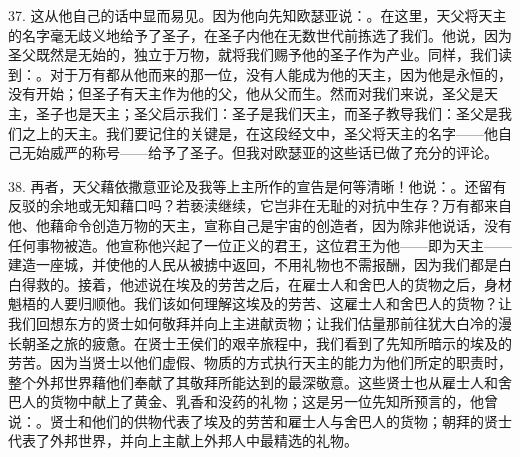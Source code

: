 37. 这从他自己的话中显而易见。因为他向先知欧瑟亚说：。在这里，天父将天主的名字毫无歧义地给予了圣子，在圣子内他在无数世代前拣选了我们。他说，因为圣父既然是无始的，独立于万物，就将我们赐予他的圣子作为产业。同样，我们读到：。对于万有都从他而来的那一位，没有人能成为他的天主，因为他是永恒的，没有开始；但圣子有天主作为他的父，他从父而生。然而对我们来说，圣父是天主，圣子也是天主；圣父启示我们：圣子是我们天主，而圣子教导我们：圣父是我们之上的天主。我们要记住的关键是，在这段经文中，圣父将天主的名字——他自己无始威严的称号——给予了圣子。但我对欧瑟亚的这些话已做了充分的评论。\par

38. 再者，天父藉依撒意亚论及我等上主所作的宣告是何等清晰！他说：。还留有反驳的余地或无知藉口吗？若亵渎继续，它岂非在无耻的对抗中生存？万有都来自他、他藉命令创造万物的天主，宣称自己是宇宙的创造者，因为除非他说话，没有任何事物被造。他宣称他兴起了一位正义的君王，这位君王为他——即为天主——建造一座城，并使他的人民从被掳中返回，不用礼物也不需报酬，因为我们都是白白得救的。接着，他述说在埃及的劳苦之后，在雇士人和舍巴人的货物之后，身材魁梧的人要归顺他。我们该如何理解这埃及的劳苦、这雇士人和舍巴人的货物？让我们回想东方的贤士如何敬拜并向上主进献贡物；让我们估量那前往犹大白冷的漫长朝圣之旅的疲惫。在贤士王侯们的艰辛旅程中，我们看到了先知所暗示的埃及的劳苦。因为当贤士以他们虚假、物质的方式执行天主的能力为他们所定的职责时，整个外邦世界藉他们奉献了其敬拜所能达到的最深敬意。这些贤士也从雇士人和舍巴人的货物中献上了黄金、乳香和没药的礼物；这是另一位先知所预言的，他曾说：。贤士和他们的供物代表了埃及的劳苦和雇士人与舍巴人的货物；朝拜的贤士代表了外邦世界，并向上主献上外邦人中最精选的礼物。\par

